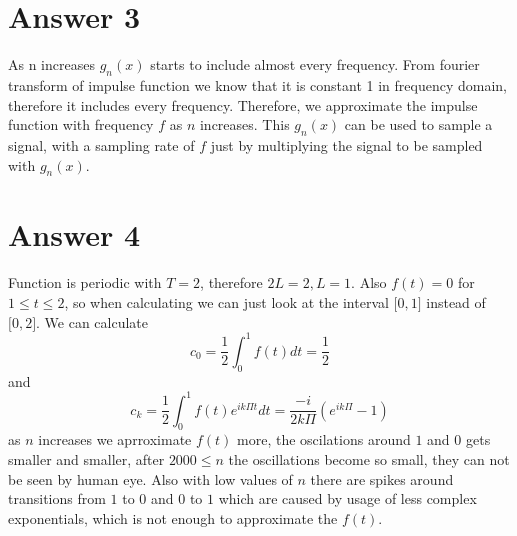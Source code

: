 \documentclass[12pt]{article}
\begin{document}
\section*{Answer 3}
As n increases $g_n(x)$ starts to include almost every frequency. From fourier transform of impulse
function we know that it is constant 1 in frequency domain, therefore it includes every frequency. 
Therefore, we approximate the impulse function with frequency $f$ as $n$ increases. 
This $g_n(x)$ can be used to sample a signal, with a sampling rate of $f$ just by multiplying the
signal to be sampled with $g_n(x)$.

\section*{Answer 4}
Function is periodic with $T=2$, therefore $2L=2, L=1$. Also $f(t)=0$ for $1\leq t\leq 2$, so
when calculating we can just look at the interval $\lbrack 0,1\rbrack$ instead of $\lbrack 0,2\rbrack$.
We can calculate $$c_0=\dfrac{1}{2}\int_{0}^{1}f(t)dt=\dfrac{1}{2}$$ and
$$c_k = \dfrac{1}{2}\int_{0}^{1}f(t)e^{ik\Pi t}dt=\dfrac{-i}{2k\Pi}(e^{ik\Pi}-1)$$ as $n$ increases
we aprroximate $f(t)$ more, the oscilations around $1$ and $0$ gets smaller and smaller, after $2000\leq n$
the oscillations become so small, they can not be seen by human eye. Also with low values of $n$ there are spikes
around transitions from $1$ to $0$ and $0$ to $1$ which are caused by usage of less complex exponentials, which
is not enough to approximate the $f(t)$.
\end{document}
